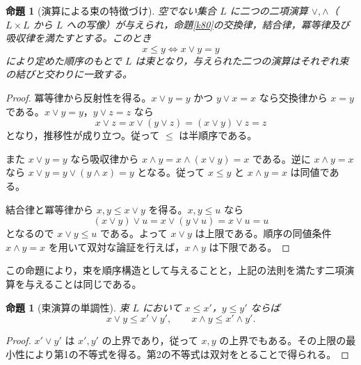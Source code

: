 \documentclass[a5paper,10pt,dvipdfmx]{jsarticle}
\theoremstyle{definition}
\theoremstyle{plain}
\newtheorem{prop}[ruledef]{命題}
\newcommand{\iffc}{\Longleftrightarrow}
\begin{document}
\begin{prop}[演算による束の特徴づけ]\label{k81}
空でない集合 $L$ に二つの二項演算 $\vee,\wedge$（$L\times L$ から $L$ への写像）が与えられ，命題\ref{k80}の交換律，結合律，冪等律及び吸収律を満たすとする。このとき
\[
 x\leq y\iffc x\vee y=y
\]
により定めた順序のもとで $L$ は束となり，与えられた二つの演算はそれぞれ束の結びと交わりに一致する。
\end{prop}
\begin{proof}
冪等律から反射性を得る。$x\vee y=y$ かつ $y\vee x=x$ なら交換律から $x=y$ である。$x\vee y=y$，$y\vee z=z$ なら
\[
 x\vee z=x\vee(y\vee z)=(x\vee y)\vee z=z
\]
となり，推移性が成り立つ。従って $\leq$ は半順序である。

また $x\vee y=y$ なら吸収律から $x\wedge y=x\wedge(x\vee y)=x$ である。逆に $x\wedge y=x$ なら $x\vee y=y\vee(y\wedge x)=y$ となる。従って $x\leq y$ と $x\wedge y=x$ は同値である。

結合律と冪等律から $x,y\leq x\vee y$ を得る。$x,y\leq u$ なら
\[
 (x\vee y)\vee u=x\vee(y\vee u)=x\vee u=u
\]
となるので $x\vee y\leq u$ である。よって $x\vee y$ は上限である。順序の同値条件 $x\wedge y=x$ を用いて双対な論証を行えば，$x\wedge y$ は下限である。
\end{proof}
この命題により，束を順序構造として与えることと，上記の法則を満たす二項演算を与えることは同じである。
\begin{prop}[束演算の単調性]\label{k82}
束 $L$ において $x\leq x'$，$y\leq y'$ ならば
\[
 x\vee y\leq x'\vee y',\qquad x\wedge y\leq x'\wedge y'.
\]
\end{prop}
\begin{proof}
$x'\vee y'$ は $x',y'$ の上界であり，従って $x,y$ の上界でもある。その上限の最小性により第1の不等式を得る。第2の不等式は双対をとることで得られる。
\end{proof}
\end{document}
